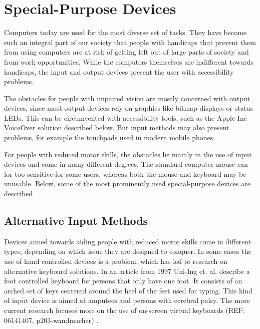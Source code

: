 \section{Special-Purpose Devices}

Computers today are used for the most diverse set of tasks. They have become such an integral part of our society that people with handicaps that prevent them from using computers are at risk of getting left out of large parts of society and from work opportunities. While the computers themselves are indifferent towards handicaps, the input and output devices present the user with accessibility problems.

The obstacles for people with impaired vision are mostly concerned with output devices, since most output devices rely on graphics like bitmap displays or status LEDs. This can be circumvented with accessibility tools, such as the Apple Inc VoiceOver solution described below. But input methods may also present problems, for example the touchpads used in modern mobile phones.

For people with reduced motor skills, the obstacles lie mainly in the use of input devices and come in many different degrees. The standard computer mouse  can for too sensitive for some users, whereas both the mouse and keyboard may be unusable. Below, some of the most prominently used special-purpose devices are described.


\subsection{Alternative Input Methods}
Devices aimed towards aiding people with reduced motor skills come in different types, depending on which issue they are designed to conquer. In some cases the use of hand controlled devices is a problem, which has led to research on alternative keyboard solutions. In an article from 1997 Uni-Ing et. al. \cite{583209} describe a foot controlled keyboard for persons that only have one foot. It consists of an arched set of keys centered around the heel of the feet used for typing. This kind of input device is aimed at amputees and persons with cerebral palsy. The more current research focuses more on the use of on-screen virtual keyboards (REF: 06141407, p203-wandmacher) . 


